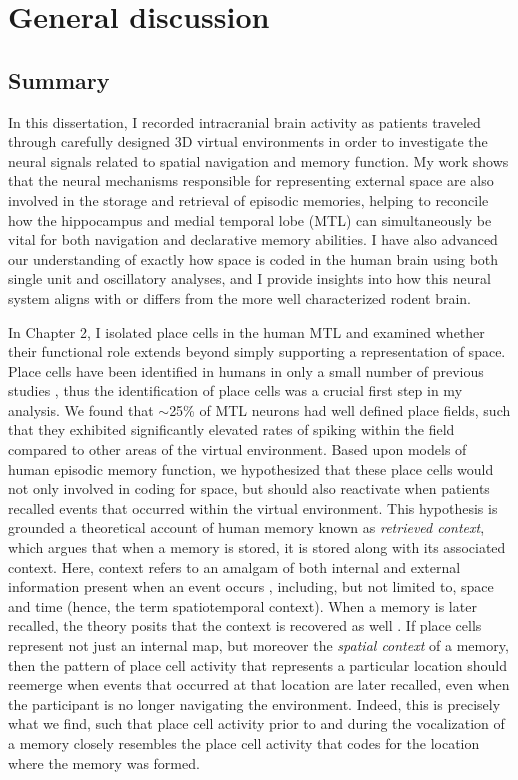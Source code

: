 \chapter{General discussion}
\large

\section{Summary}

In this dissertation, I recorded intracranial brain activity as patients traveled through carefully designed 3D virtual environments in order to investigate the neural signals related to spatial navigation and memory function. My work shows that the neural mechanisms responsible for representing external space are also involved in the storage and retrieval of episodic memories, helping to reconcile how the hippocampus and medial temporal lobe (MTL) can simultaneously be vital for both navigation and declarative memory abilities. I have also advanced our understanding of exactly how space is coded in the human brain using both single unit and oscillatory analyses, and I provide insights into how this neural system aligns with or differs from the more well characterized rodent brain. 

In Chapter 2, I isolated place cells in the human MTL and examined whether their functional role extends beyond simply supporting a representation of space. Place cells have been identified in humans in only a small number of previous studies \citep{EkstEtal03,JacoEtal10}, thus the identification of place cells was a crucial first step in my analysis. We found that $\sim$25\% of MTL neurons had well defined place fields, such that they exhibited significantly elevated rates of spiking within the field compared to other areas of the virtual environment. Based upon models of human episodic memory function, we hypothesized that these place cells would not only involved in coding for space, but should also reactivate when patients recalled events that occurred within the virtual environment. This hypothesis is grounded a theoretical account of human memory known as \textit{retrieved context}, which argues that when a memory is stored, it is stored along with its associated context. Here, context refers to an amalgam of both internal and external information present when an event occurs \citep{McGe42,Bowe72}, including, but not limited to, space and time (hence, the term spatiotemporal context). When a memory is later recalled, the theory posits that the context is recovered as well \citep{HowaKaha02a,PolyEtalTulv,LohnKaha13a}. If place cells represent not just an internal map, but moreover the \textit{spatial context} of a memory, then the pattern of place cell activity that represents a particular location should reemerge when events that occurred at that location are later recalled, even when the participant is no longer navigating the environment. Indeed, this is precisely what we find, such that place cell activity prior to and during the vocalization of a memory closely resembles the place cell activity that codes for the location where the memory was formed.



